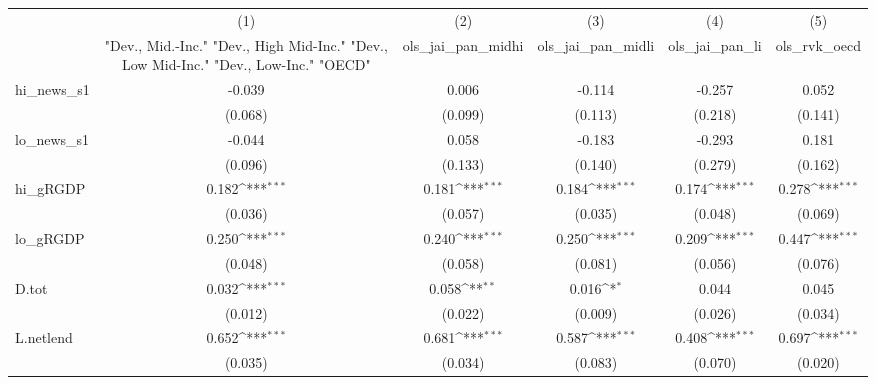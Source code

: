 {
\def\sym#1{\ifmmode^{#1}\else\(^{#1}\)\fi}
\begin{tabular}{l*{5}{c}}
\toprule
            &\multicolumn{1}{c}{(1)}&\multicolumn{1}{c}{(2)}&\multicolumn{1}{c}{(3)}&\multicolumn{1}{c}{(4)}&\multicolumn{1}{c}{(5)}\\
            &\multicolumn{1}{c}{ "Dev., Mid.-Inc." "Dev., High Mid-Inc." "Dev., Low Mid-Inc." "Dev., Low-Inc." "OECD" }&\multicolumn{1}{c}{ols\_jai\_pan\_midhi}&\multicolumn{1}{c}{ols\_jai\_pan\_midli}&\multicolumn{1}{c}{ols\_jai\_pan\_li}&\multicolumn{1}{c}{ols\_rvk\_oecd}\\
\midrule
hi\_news\_s1  &      -0.039         &       0.006         &      -0.114         &      -0.257         &       0.052         \\
            &     (0.068)         &     (0.099)         &     (0.113)         &     (0.218)         &     (0.141)         \\
\addlinespace
lo\_news\_s1  &      -0.044         &       0.058         &      -0.183         &      -0.293         &       0.181         \\
            &     (0.096)         &     (0.133)         &     (0.140)         &     (0.279)         &     (0.162)         \\
\addlinespace
hi\_gRGDP    &       0.182\sym{***}&       0.181\sym{***}&       0.184\sym{***}&       0.174\sym{***}&       0.278\sym{***}\\
            &     (0.036)         &     (0.057)         &     (0.035)         &     (0.048)         &     (0.069)         \\
\addlinespace
lo\_gRGDP    &       0.250\sym{***}&       0.240\sym{***}&       0.250\sym{***}&       0.209\sym{***}&       0.447\sym{***}\\
            &     (0.048)         &     (0.058)         &     (0.081)         &     (0.056)         &     (0.076)         \\
\addlinespace
D.tot       &       0.032\sym{***}&       0.058\sym{**} &       0.016\sym{*}  &       0.044         &       0.045         \\
            &     (0.012)         &     (0.022)         &     (0.009)         &     (0.026)         &     (0.034)         \\
\addlinespace
L.netlend   &       0.652\sym{***}&       0.681\sym{***}&       0.587\sym{***}&       0.408\sym{***}&       0.697\sym{***}\\
            &     (0.035)         &     (0.034)         &     (0.083)         &     (0.070)         &     (0.020)         \\

\end{tabular}}

